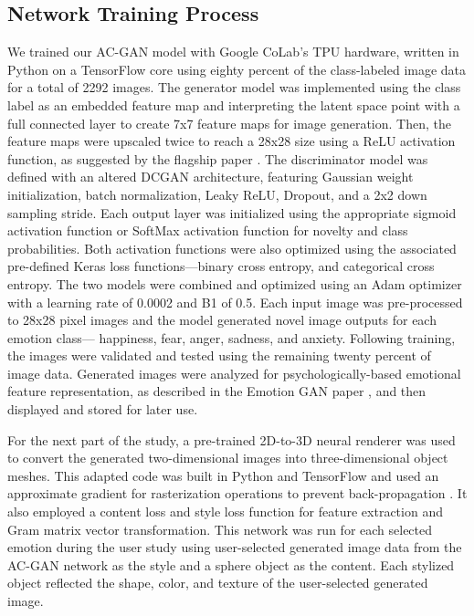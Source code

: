 \documentclass{sigchi}
\begin{document}
\subsection{Network Training Process}
We trained our AC-GAN model with Google CoLab’s TPU hardware, written in Python on a TensorFlow core using eighty percent of the class-labeled image data for a total of 2292 images. The generator model was implemented using the class label as an embedded feature map and interpreting the latent space point with a full connected layer to create 7x7 feature maps for image generation. Then, the feature maps were upscaled twice to reach a 28x28 size using a ReLU activation function, as suggested by the flagship paper \cite{10.5555/3305890.3305954}. The discriminator model was defined with an altered DCGAN architecture, featuring Gaussian weight initialization, batch normalization, Leaky ReLU, Dropout, and a 2x2 down sampling stride. Each output layer was initialized using the appropriate sigmoid activation function or SoftMax activation function for novelty and class probabilities. Both activation functions were also optimized using the associated pre-defined Keras loss functions—binary cross entropy, and categorical cross entropy. The two models were combined and optimized using an Adam optimizer with a learning rate of 0.0002 and B1 of 0.5. Each input image was pre-processed to 28x28 pixel images and the model generated novel image outputs for each emotion class— happiness, fear, anger, sadness, and anxiety. Following training, the images were validated and tested using the remaining twenty percent of image data. Generated images were analyzed for psychologically-based emotional feature representation, as described in the Emotion GAN paper \cite{AlvarezMelis2017TheEG}, and then displayed and stored for later use. 

For the next part of the study, a pre-trained 2D-to-3D neural renderer \cite{DBLP:journals/corr/abs-1711-07566} was used to convert the generated two-dimensional images into three-dimensional object meshes. This adapted code was built in Python and TensorFlow and used an approximate gradient for rasterization operations to prevent back-propagation \cite{DBLP:journals/corr/abs-1711-07566}. It also employed a content loss and style loss function for feature extraction and Gram matrix vector transformation. This network was run for each selected emotion during the user study using user-selected generated image data from the AC-GAN network as the style and a sphere object as the content. Each stylized object reflected the shape, color, and texture of the user-selected generated image. 
\end{document}
